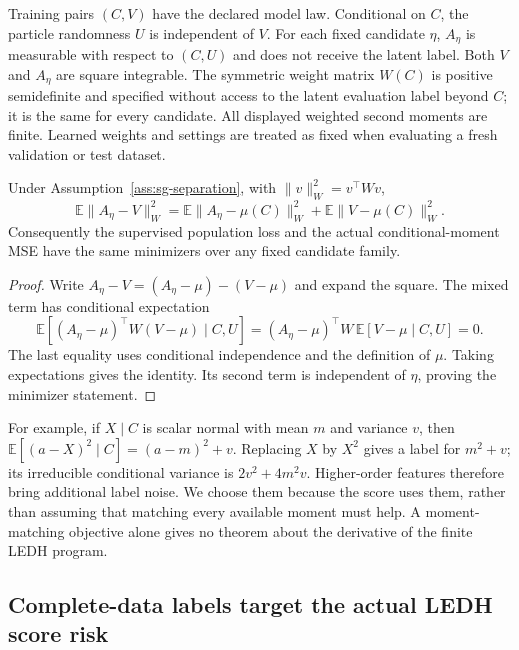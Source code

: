 \begin{assumption}
\label{ass:sg-separation}
Training pairs $(C,V)$ have the declared model law. Conditional on $C$, the
particle randomness $U$ is independent of $V$. For each fixed candidate
$\eta$, $A_\eta$ is measurable with respect to $(C,U)$ and does not receive
the latent label. Both $V$ and $A_\eta$ are square integrable. The symmetric
weight matrix $W(C)$ is positive semidefinite and specified without access to
the latent evaluation label beyond $C$; it is the same for every candidate.
All displayed weighted second moments are finite. Learned weights and settings are treated
as fixed when evaluating a fresh validation or test dataset.
\end{assumption}

\begin{proposition}
\label{prop:sg-moment-risk}
Under Assumption~\ref{ass:sg-separation}, with
$\|v\|_W^2=v^\top Wv$,
\begin{equation}
\mathbb E\|A_\eta-V\|_W^2
=\mathbb E\|A_\eta-\mu(C)\|_W^2
 +\mathbb E\|V-\mu(C)\|_W^2.
\label{eq:sg-moment-risk}
\end{equation}
Consequently the supervised population loss and the actual conditional-moment
MSE have the same minimizers over any fixed candidate family.
\end{proposition}
\begin{proof}
Write $A_\eta-V=(A_\eta-\mu)-(V-\mu)$ and expand the square.
The mixed term has conditional expectation
\[
\mathbb E[(A_\eta-\mu)^\top W(V-\mu)\mid C,U]
=(A_\eta-\mu)^\top W\,
  \mathbb E[V-\mu\mid C,U]=0.
\]
The last equality uses conditional independence and the definition of $\mu$.
Taking expectations gives the identity. Its second term is independent of
$\eta$, proving the minimizer statement.
\end{proof}

For example, if $X\mid C$ is scalar normal with mean $m$ and variance $v$,
then $\mathbb E[(a-X)^2\mid C]=(a-m)^2+v$.
Replacing $X$ by $X^2$ gives a label for $m^2+v$; its irreducible conditional
variance is $2v^2+4m^2v$. Higher-order features therefore bring additional
label noise. We choose them because the score uses them, rather than assuming
that matching every available moment must help. A moment-matching objective
alone gives no theorem about the derivative of the finite LEDH program.

\subsection{Complete-data labels target the actual LEDH score risk}

